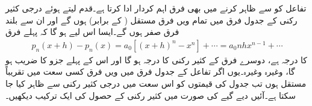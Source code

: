 تفاعل کو  سے ظاہر کرنے میں بھی فرق اہم کردار ادا کرتا ہے۔قدم  لیتے ہوئے  درجی کثیر رکنی  کے جدول فرق میں تمام  ویں فرق مستقل ( کے برابر) ہوں گے اور ان سے بلند فرق صفر ہوں گے۔ایسا اس لیے ہو گا کہ پہلے فرق 
\begin{align*}
p_n(x+h)-p_n(x)=a_0[(x+h)^n-x^n]+\cdots=a_0nhx^{n-1}+\cdots
\end{align*} 
کا درجہ  ہے، دوسرے فرق کے کثیر رکنی کا درجہ  ہو گا اور اس کے پہلے جزو کا  ضریب   ہو گا، وغیرہ وغیرہ۔یوں  اگر تفاعل  کے جدول فرق میں  ویں فرق کسی سعت میں تقریباً مستقل ہوں تب جدول کی قیمتوں کو اس سعت میں  درجی کثیر رکنی  سے ظاہر کیا جا سکتا ہے۔آئیں دیے  گیے   کی صورت میں کثیر رکنی  کے حصول کی ایک ترکیب دیکھیں۔     

